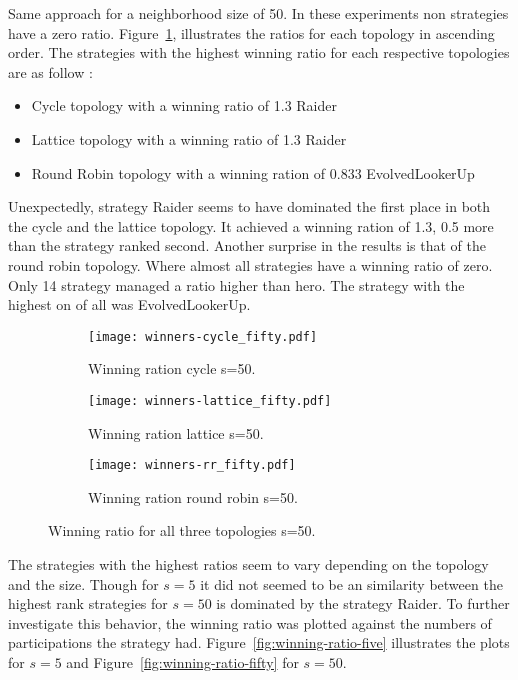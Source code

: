 \newpage

Same approach for a neighborhood size of 50. In these experiments
non strategies have a zero ratio. Figure~\ref{fig:winning-fifty}, illustrates the ratios
for each topology in ascending order. The strategies with the highest winning ratio
for each respective topologies are as follow :

\begin{itemize}
  \item Cycle topology with a winning ratio of 1.3 Raider
  \item Lattice topology with a winning ratio of 1.3 Raider
  \item Round Robin topology with a winning ration of 0.833 EvolvedLookerUp
\end{itemize}

Unexpectedly, strategy Raider seems to have dominated the first place in both
the cycle and the lattice topology. It achieved a winning ration of 1.3, 0.5
more than the strategy ranked second. Another surprise in the results is
that of the round robin topology. Where almost all strategies have a winning ratio
of zero. Only 14 strategy managed a ratio higher than hero. The strategy with
the highest on of all was EvolvedLookerUp.

\begin{figure}[H]
\centering
    \begin{subfigure}[t]{1\textwidth}
    \centering
        \texttt{[image: winners-cycle\_fifty.pdf]}
    \caption{Winning ration cycle s=50.}
    \end{subfigure}
\hfill
    \begin{subfigure}[t]{1\textwidth}\centering
    \centering
        \texttt{[image: winners-lattice\_fifty.pdf]}
    \caption{Winning ration lattice s=50.}
    \end{subfigure}
\hfill
    \begin{subfigure}[t]{1\textwidth}\centering
    \centering
        \texttt{[image: winners-rr\_fifty.pdf]}
    \caption{Winning ration round robin s=50.}
    \end{subfigure}
\caption{Winning ratio for all three topologies s=50.}
\label{fig:winning-fifty}
\end{figure}

The strategies with the highest ratios seem to vary depending on the topology
and the size. Though for \(s=5\) it did not seemed to be an similarity between
the highest rank strategies for \(s=50\) is dominated by the strategy Raider.
To further investigate this behavior, the winning ratio was plotted against
the numbers of participations the strategy had. Figure~\ref{fig:winning-ratio-five}
illustrates the plots for \(s=5\) and Figure~\ref{fig:winning-ratio-fifty} for \(s=50\).

